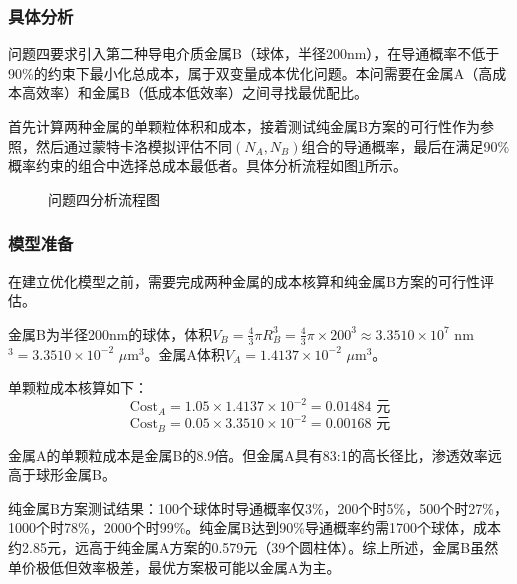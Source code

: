 
\subsubsection{具体分析}

问题四要求引入第二种导电介质金属B（球体，半径200nm），在导通概率不低于90\%的约束下最小化总成本，属于双变量成本优化问题。本问需要在金属A（高成本高效率）和金属B（低成本低效率）之间寻找最优配比。

首先计算两种金属的单颗粒体积和成本，接着测试纯金属B方案的可行性作为参照，然后通过蒙特卡洛模拟评估不同$(N_A, N_B)$组合的导通概率，最后在满足90\%概率约束的组合中选择总成本最低者。具体分析流程如图\ref{fig:analysis4_flow}所示。

\begin{figure}[ht]
  \begin{center}
    \caption{问题四分析流程图}
    \label{fig:analysis4_flow}
  \end{center}
\end{figure}

\subsubsection{模型准备}

在建立优化模型之前，需要完成两种金属的成本核算和纯金属B方案的可行性评估。

金属B为半径200nm的球体，体积$V_B = \frac{4}{3}\pi R_B^3 = \frac{4}{3}\pi \times 200^3 \approx 3.3510 \times 10^7$ nm$^3 = 3.3510 \times 10^{-2}$ $\mu$m$^3$。金属A体积$V_A = 1.4137 \times 10^{-2}$ $\mu$m$^3$。

单颗粒成本核算如下：
\begin{equation}
\text{Cost}_A = 1.05 \times 1.4137 \times 10^{-2} = 0.01484 \text{ 元}
\end{equation}
\begin{equation}
\text{Cost}_B = 0.05 \times 3.3510 \times 10^{-2} = 0.00168 \text{ 元}
\end{equation}

金属A的单颗粒成本是金属B的8.9倍。但金属A具有83:1的高长径比，渗透效率远高于球形金属B。

纯金属B方案测试结果：100个球体时导通概率仅3\%，200个时5\%，500个时27\%，1000个时78\%，2000个时99\%。纯金属B达到90\%导通概率约需1700个球体，成本约2.85元，远高于纯金属A方案的0.579元（39个圆柱体）。综上所述，金属B虽然单价极低但效率极差，最优方案极可能以金属A为主。
